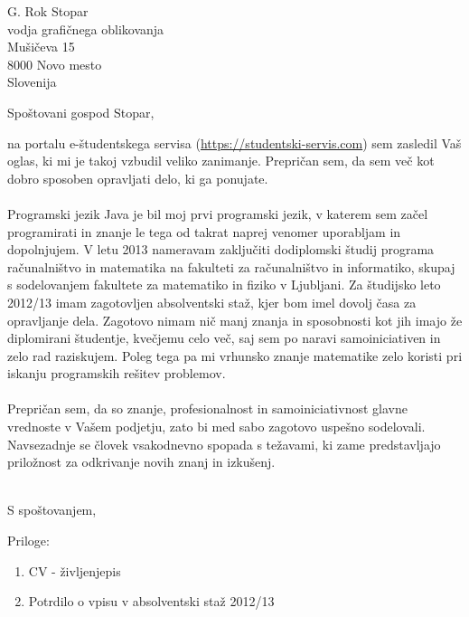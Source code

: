\documentclass[a4paper]{scrlttr2}
\begin{document}
 
\begin{letter}{G. Rok Stopar \\ vodja grafičnega oblikovanja \\ Mušičeva 15 \\ 8000 Novo mesto \\ Slovenija}
 

\opening{Spoštovani gospod Stopar,}
 
na portalu e-študentskega servisa (\url{https://studentski-servis.com}) sem zasledil Vaš oglas, ki mi je takoj vzbudil veliko zanimanje. Prepričan sem, da sem več kot dobro sposoben opravljati delo, ki ga ponujate. 
\\
\\
Programski jezik Java je bil moj prvi programski jezik, v katerem sem začel programirati in znanje le tega od takrat naprej venomer uporabljam in dopolnjujem. V letu 2013 nameravam zaključiti dodiplomski študij programa računalništvo in matematika na fakulteti za računalništvo in informatiko, skupaj s sodelovanjem fakultete za matematiko in fiziko v Ljubljani. Za študijsko leto 2012/13 imam zagotovljen absolventski staž, kjer bom imel dovolj časa za opravljanje dela. Zagotovo nimam nič manj znanja in sposobnosti kot jih imajo že diplomirani študentje, kvečjemu celo več, saj sem po naravi samoiniciativen in zelo rad raziskujem. Poleg tega pa mi vrhunsko znanje matematike zelo koristi pri iskanju programskih rešitev problemov.
\\
\\
Prepričan sem, da so znanje, profesionalnost in samoiniciativnost glavne vrednoste v Vašem podjetju, zato bi med sabo zagotovo uspešno sodelovali. Navsezadnje se človek vsakodnevno spopada s težavami, ki zame predstavljajo priložnost za odkrivanje novih znanj in izkušenj.
\\
\\
\closing{S spoštovanjem,}

\pagebreak


Priloge: \\
\begin{enumerate}
\item CV - življenjepis
\item Potrdilo o vpisu v absolventski staž 2012/13
\end{enumerate}


 
\end{letter}
 
\end{document}
